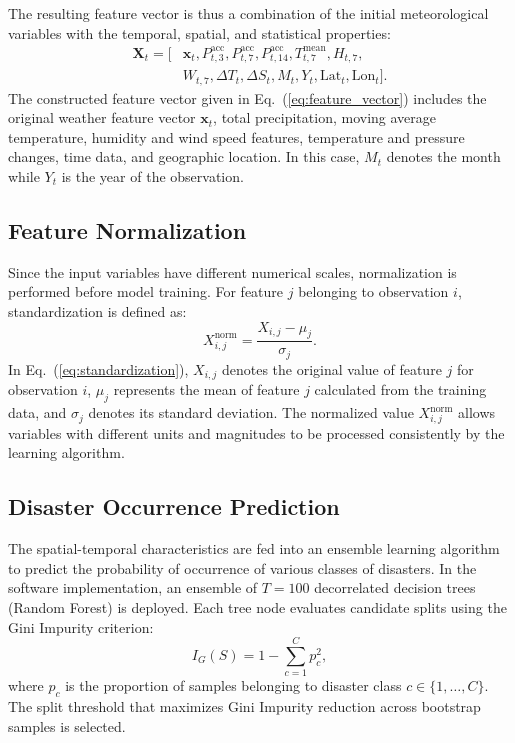 \documentclass[conference]{IEEEtran}
\begin{document}
The resulting feature vector is thus a combination of the initial meteorological variables with the temporal, spatial, and statistical properties:
\begin{equation}
\begin{aligned}
\mathbf{X}_t = \big[ &\mathbf{x}_t, P^{\text{acc}}_{t,3}, P^{\text{acc}}_{t,7}, P^{\text{acc}}_{t,14}, T^{\text{mean}}_{t,7}, H_{t,7}, \\
&W_{t,7}, \Delta T_t, \Delta S_t, M_t, Y_t, \text{Lat}_t, \text{Lon}_t \big].
\end{aligned}
\label{eq:feature_vector}
\end{equation}
The constructed feature vector given in Eq.~(\ref{eq:feature_vector}) includes the original weather feature vector $\mathbf{x}_t$, total precipitation, moving average temperature, humidity and wind speed features, temperature and pressure changes, time data, and geographic location. In this case, $M_t$ denotes the month while $Y_t$ is the year of the observation.

\subsection{Feature Normalization}
Since the input variables have different numerical scales, normalization is performed before model training. For feature $j$ belonging to observation $i$, standardization is defined as:
\begin{equation}
X^{\text{norm}}_{i,j} = \frac{X_{i,j} - \mu_j}{\sigma_j}.
\label{eq:standardization}
\end{equation}
In Eq.~(\ref{eq:standardization}), $X_{i,j}$ denotes the original value of feature $j$ for observation $i$, $\mu_j$ represents the mean of feature $j$ calculated from the training data, and $\sigma_j$ denotes its standard deviation. The normalized value $X^{\text{norm}}_{i,j}$ allows variables with different units and magnitudes to be processed consistently by the learning algorithm.

\subsection{Disaster Occurrence Prediction}
The spatial-temporal characteristics are fed into an ensemble learning algorithm to predict the probability of occurrence of various classes of disasters. In the software implementation, an ensemble of $T = 100$ decorrelated decision trees (Random Forest) is deployed. Each tree node evaluates candidate splits using the Gini Impurity criterion:
\begin{equation}
I_G(S) = 1 - \sum_{c=1}^C p_c^2,
\label{eq:gini}
\end{equation}
where $p_c$ is the proportion of samples belonging to disaster class $c \in \{1, \dots, C\}$. The split threshold that maximizes Gini Impurity reduction across bootstrap samples is selected.
\end{document}
